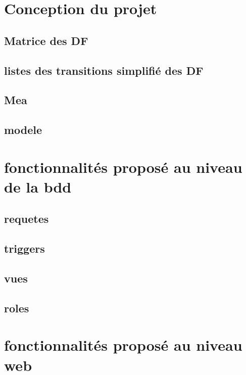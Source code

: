 \documentclass{report}
\begin{document}
\chapter{Conception du projet}
\section{Matrice des DF}
\section{listes des transitions simplifié des DF}
\section{Mea}
\section{modele}
\chapter{fonctionnalités proposé au niveau de la bdd}
\section{requetes}
\section{triggers}
\section{vues}
\section{roles}
\chapter{fonctionnalités proposé au niveau web}
\end{document}
